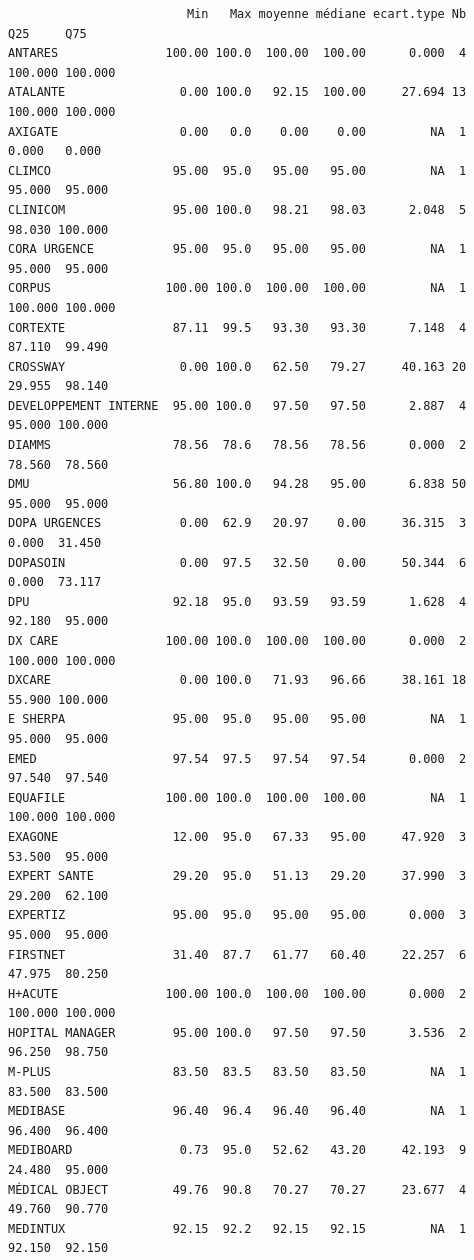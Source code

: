 \documentclass[]{article}
\begin{document}
\begin{verbatim}
                         Min   Max moyenne médiane ecart.type Nb     Q25     Q75
ANTARES               100.00 100.0  100.00  100.00      0.000  4 100.000 100.000
ATALANTE                0.00 100.0   92.15  100.00     27.694 13 100.000 100.000
AXIGATE                 0.00   0.0    0.00    0.00         NA  1   0.000   0.000
CLIMCO                 95.00  95.0   95.00   95.00         NA  1  95.000  95.000
CLINICOM               95.00 100.0   98.21   98.03      2.048  5  98.030 100.000
CORA URGENCE           95.00  95.0   95.00   95.00         NA  1  95.000  95.000
CORPUS                100.00 100.0  100.00  100.00         NA  1 100.000 100.000
CORTEXTE               87.11  99.5   93.30   93.30      7.148  4  87.110  99.490
CROSSWAY                0.00 100.0   62.50   79.27     40.163 20  29.955  98.140
DEVELOPPEMENT INTERNE  95.00 100.0   97.50   97.50      2.887  4  95.000 100.000
DIAMMS                 78.56  78.6   78.56   78.56      0.000  2  78.560  78.560
DMU                    56.80 100.0   94.28   95.00      6.838 50  95.000  95.000
DOPA URGENCES           0.00  62.9   20.97    0.00     36.315  3   0.000  31.450
DOPASOIN                0.00  97.5   32.50    0.00     50.344  6   0.000  73.117
DPU                    92.18  95.0   93.59   93.59      1.628  4  92.180  95.000
DX CARE               100.00 100.0  100.00  100.00      0.000  2 100.000 100.000
DXCARE                  0.00 100.0   71.93   96.66     38.161 18  55.900 100.000
E SHERPA               95.00  95.0   95.00   95.00         NA  1  95.000  95.000
EMED                   97.54  97.5   97.54   97.54      0.000  2  97.540  97.540
EQUAFILE              100.00 100.0  100.00  100.00         NA  1 100.000 100.000
EXAGONE                12.00  95.0   67.33   95.00     47.920  3  53.500  95.000
EXPERT SANTE           29.20  95.0   51.13   29.20     37.990  3  29.200  62.100
EXPERTIZ               95.00  95.0   95.00   95.00      0.000  3  95.000  95.000
FIRSTNET               31.40  87.7   61.77   60.40     22.257  6  47.975  80.250
H+ACUTE               100.00 100.0  100.00  100.00      0.000  2 100.000 100.000
HOPITAL MANAGER        95.00 100.0   97.50   97.50      3.536  2  96.250  98.750
M-PLUS                 83.50  83.5   83.50   83.50         NA  1  83.500  83.500
MEDIBASE               96.40  96.4   96.40   96.40         NA  1  96.400  96.400
MEDIBOARD               0.73  95.0   52.62   43.20     42.193  9  24.480  95.000
MÉDICAL OBJECT         49.76  90.8   70.27   70.27     23.677  4  49.760  90.770
MEDINTUX               92.15  92.2   92.15   92.15         NA  1  92.150  92.150

\end{verbatim}
\end{document}
